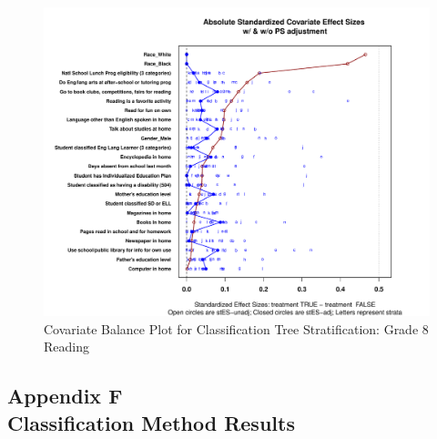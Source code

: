 \begin{figure}
\begin{center}
\includegraphics[width=\textwidth]{../Figures2009/g8read-tree-balance.pdf}
\caption{Covariate Balance Plot for Classification Tree Stratification: Grade 8 Reading}
\end{center}
\end{figure}

\clearpage
{}
\subsection*{Appendix F\\Classification Method Results}

